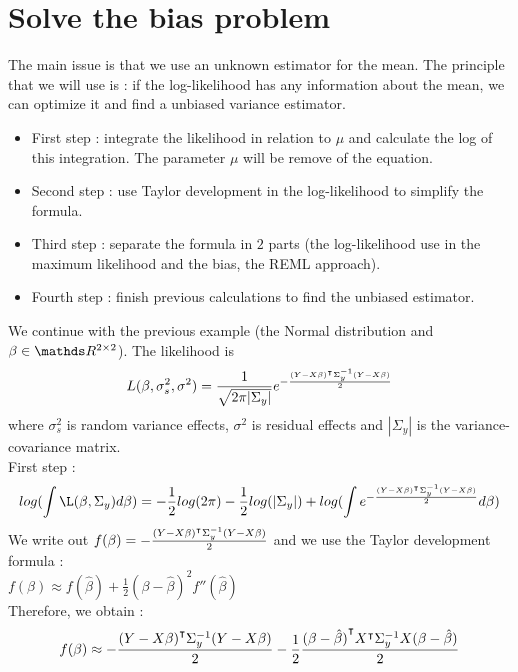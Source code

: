 \documentclass{article}
\begin{document}

\section{Solve the bias problem}
\begin{exemple}
The main issue is that we use an unknown estimator for the mean. The principle that we will use is : if the log-likelihood has any information about the mean, we can optimize it and find a unbiased variance estimator.\\
\begin{itemize}
    \item First step : integrate the likelihood in relation to $\mu$ and calculate the log of this integration. The parameter $\mu$ will be remove of the equation.
    \item Second step : use Taylor development in the log-likelihood to simplify the formula. 
    \item Third step : separate the formula in $2$ parts (the log-likelihood use in the maximum likelihood and the bias, the REML approach).
    \item Fourth step : finish previous calculations to find the unbiased estimator.
\end{itemize}

\begin{exemple} 
We continue with the previous example (the Normal distribution and $\beta \in \bbR^{2\times 2}$). The likelihood is
\[L(\beta, \sigma_s^2, \sigma^2) = \frac{1}{\sqrt{2\pi |\Sigma_y|}}e^{-\frac{{(Y-X\beta)}^\intercal\Sigma_y^{-1}(Y-X\beta)}{2}}\]
where $\sigma_s^2$ is random variance effects, $\sigma^2$ is residual effects and $|\Sigma_y|$ is the variance-covariance matrix.\\
First step :
\[log(\int \L(\beta, \Sigma_y)d\beta) = -\frac{1}{2}log(2\pi)-\frac{1}{2}log(|\Sigma_y|)+log(\int e^{-\frac{\trans{(Y-X\beta)}\Sigma_y^{-1}(Y-X\beta)}{2}} d\beta)\]
We write out $f(\beta) = -\frac{{(Y-X\beta)}^\intercal\Sigma_y^{-1}(Y-X\beta)}{2}$ and we use the Taylor development formula : \\
$f(\beta) \approx f(\hat{\beta}) + \frac{1}{2}(\beta - \hat{\beta})^2f''(\hat{\beta})$\\
Therefore, we obtain :
\[f(\beta) \approx -\frac{{(Y-X\beta)}^\intercal\Sigma_y^{-1}(Y-X\beta)}{2}-\frac{1}{2}\frac{{(\beta-\hat{\beta})}^\intercal {X}^\intercal \Sigma_y^{-1}X (\beta-\hat{\beta})}{2}\]


\end{exemple}
\end{exemple}
\end{document}
